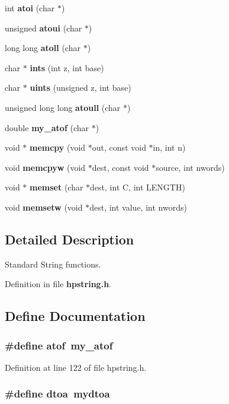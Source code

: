 \begin{CompactItemize}
int {\bf atoi} (char $\ast$)
\item 
unsigned {\bf atoui} (char $\ast$)
\item 
long long {\bf atoll} (char $\ast$)
\item 
char $\ast$ {\bf ints} (int z, int base)
\item 
char $\ast$ {\bf uints} (unsigned z, int base)
\item 
unsigned long long {\bf atoull} (char $\ast$)
\item 
double {\bf my\_\-atof} (char $\ast$)
\item 
void $\ast$ {\bf memcpy} (void $\ast$out, const void $\ast$in, int n)
\item 
void {\bf memcpyw} (void $\ast$dest, const void $\ast$source, int nwords)
\item 
void $\ast$ {\bf memset} (char $\ast$dest, int C, int LENGTH)
\item 
void {\bf memsetw} (void $\ast$dest, int value, int nwords)
\end{CompactItemize}


\subsection{Detailed Description}
Standard String functions.





Definition in file {\bf hpstring.h}.

\subsection{Define Documentation}
\subsubsection{\setlength{\rightskip}{0pt plus 5cm}\#define atof\ my\_\-atof}\label{hpstring_8h_a1}




Definition at line 122 of file hpstring.h.
\subsubsection{\setlength{\rightskip}{0pt plus 5cm}\#define dtoa\ mydtoa}\label{hpstring_8h_a0}




